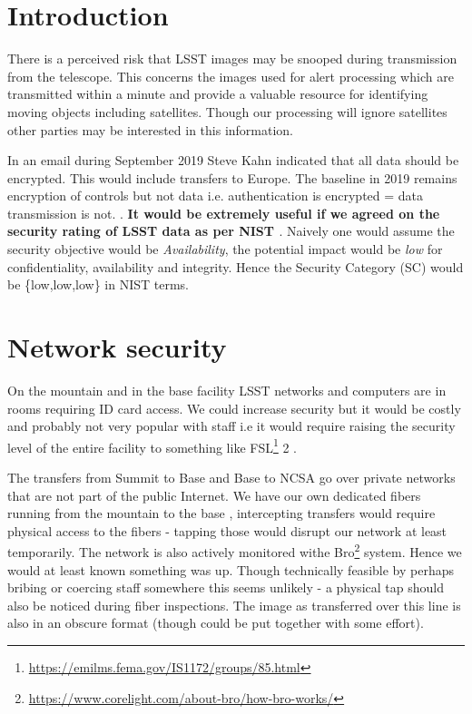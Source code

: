 \section{Introduction} \label{sec:intro}


There is a perceived  risk that LSST  images may be snooped during transmission from the telescope. This concerns the images used for alert processing which are transmitted within a minute and provide a valuable resource for identifying moving objects including satellites. Though our processing will ignore satellites other parties may be interested in this information.

In an email during September 2019 Steve Kahn indicated that all data should be encrypted. This would include transfers to Europe.
The baseline in 2019 remains encryption of controls but not data i.e. authentication is encrypted = data transmission is not.
.
{\bf It would be extremely useful if we agreed on the security rating of LSST data as per NIST  \citep{nist800-60}}.
Naively one would assume the security objective would be \emph{Availability}, the potential impact would be \emph{low} for confidentiality, availability and integrity. Hence  the Security Category (SC) would be \{low,low,low\} in NIST terms.

\section{Network security}\label{sec:net}

On the mountain and in the base facility LSST networks and computers are in rooms requiring ID card access.
We could increase security but it would be costly and probably not very popular with staff i.e it would require raising the security level of the entire facility to something like FSL\footnote{\url{https://emilms.fema.gov/IS1172/groups/85.html}} 2 .

The transfers from Summit to Base and Base to NCSA go over private networks that are not part of the public Internet. We have our own dedicated fibers running from the mountain to the base ,
intercepting transfers would require physical access to the fibers - tapping those would disrupt our network at least temporarily.  The network is also actively monitored withe Bro\footnote{\url{https://www.corelight.com/about-bro/how-bro-works/}} system. Hence we would at least known something was up.
Though technically feasible by perhaps bribing or coercing staff somewhere this seems unlikely - a physical tap should also be noticed during fiber inspections.  The image as transferred over this line is also in an obscure format (though could be put together with some effort).


